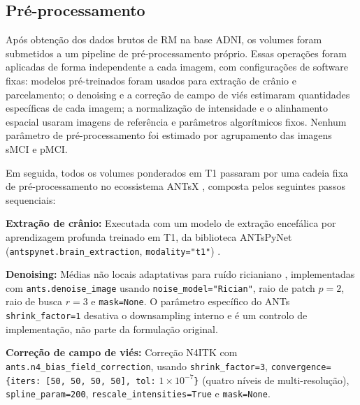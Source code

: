 \documentclass[review]{elsarticle}
\newcommand{\code}[1]{\texttt{#1}}
\begin{document}
	\subsection{Pré-processamento}
	\label{sec:preprocessamento}
	
	Após obtenção dos dados brutos de RM na base ADNI, os volumes foram submetidos a um pipeline de pré-processamento próprio. Essas operações foram aplicadas de forma independente a cada imagem, com configurações de software fixas: modelos pré-treinados foram usados para extração de crânio e parcelamento; o denoising e a correção de campo de viés estimaram quantidades específicas de cada imagem; a normalização de intensidade e o alinhamento espacial usaram imagens de referência e parâmetros algorítmicos fixos. Nenhum parâmetro de pré-processamento foi estimado por agrupamento das imagens sMCI e pMCI.
	
	
	Em seguida, todos os volumes ponderados em T1 passaram por uma cadeia fixa de pré-processamento no ecossistema ANTsX \cite{tustison-2021}, composta pelos seguintes passos sequenciais:
	
	\textbf{Extração de crânio:} Executada com um modelo de extração encefálica por aprendizagem profunda treinado em T1, da biblioteca ANTsPyNet (\code{antspynet.brain\_extraction}, \code{modality="t1"}) \cite{tustison-2021}.
		
	\textbf{Denoising:} Médias não locais adaptativas para ruído ricianiano \cite{manjon-2010}, implementadas com \code{ants.denoise\_image} usando \code{noise\_model="Rician"}, raio de patch $p=2$, raio de busca $r=3$ e \code{mask=None}. O parâmetro específico do ANTs \code{shrink\_factor=1} desativa o downsampling interno e é um controlo de implementação, não parte da formulação original.
		
	\textbf{Correção de campo de viés:} Correção N4ITK \cite{tustison-2010} com \code{ants.n4\_bias\_field\_correction}, usando \code{shrink\_factor=3}, \code{convergence=\{iters: [50, 50, 50, 50], tol:} \(1\times10^{-7}\)\code{\}} (quatro níveis de multi-resolução), \code{spline\_param=200}, \code{rescale\_intensities=True} e \code{mask=None}.
		
\end{document}
